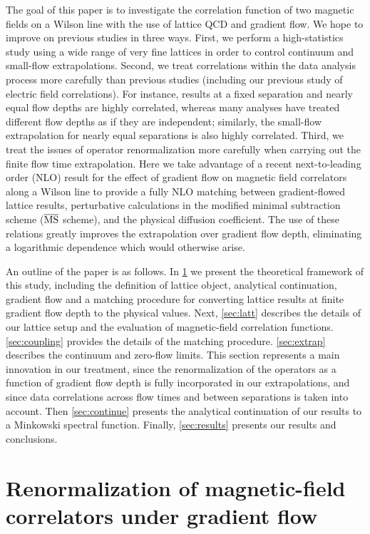 \documentclass[floatfix,twocolumn,prd,showpacs,preprintnumbers,amsmath,nofootinbib,amssymb,superscriptaddress]{revtex4-2}
\begin{document}
The goal of this paper is to investigate the correlation function of two magnetic fields on a Wilson line with the use of lattice QCD and gradient flow.
We hope to improve on previous studies in three ways.
First, we perform a high-statistics study using a wide range of very fine lattices in order to control continuum and small-flow extrapolations.
Second, we treat correlations within the data analysis process more carefully than previous studies (including our previous study of electric field correlations).
For instance, results at a fixed separation and nearly equal flow depths are highly correlated, whereas many analyses have treated different flow depths as if they are independent; similarly, the small-flow extrapolation for nearly equal separations is also highly correlated.
Third, we treat the issues of operator renormalization more carefully when carrying out the finite flow time extrapolation.
Here we take advantage of a recent next-to-leading order (NLO) result for the effect of gradient flow on magnetic field correlators along a Wilson line to provide a fully NLO matching between gradient-flowed lattice results, perturbative calculations in the modified minimal subtraction scheme ($\overline{\text{MS}}$ scheme), and the physical diffusion coefficient.
The use of these relations greatly improves the extrapolation over gradient flow depth, eliminating a logarithmic dependence which would otherwise arise.

An outline of the paper is as follows. 
In \cref{sec:renorm} we present the theoretical framework of this study, including the definition of lattice object, analytical continuation, gradient flow and a matching procedure for converting lattice results at finite gradient flow depth to the physical values.
Next, \cref{sec:latt} describes the details of our lattice setup and the evaluation of magnetic-field correlation functions.
 \cref{sec:coupling} provides the details of the matching procedure.
\cref{sec:extrap} describes the continuum and zero-flow limits.
This section represents a main innovation in our treatment, since the renormalization of the operators as a function of gradient flow depth is fully incorporated in our extrapolations, and since data correlations across flow times and between separations is taken into account.
Then \cref{sec:continue} presents the analytical continuation of our results to a Minkowski spectral function.
Finally, \cref{sec:results} presents our results and conclusions.

\section{Renormalization of magnetic-field correlators under gradient flow}
\label{sec:renorm}
\end{document}
